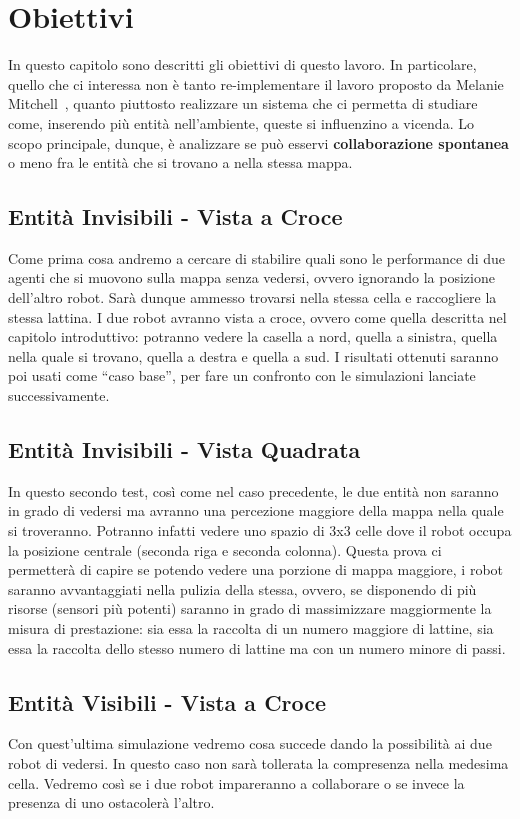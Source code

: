 \chapter{Obiettivi}
In questo capitolo sono descritti gli obiettivi di questo lavoro. In
particolare, quello che ci interessa non è tanto re-implementare il lavoro
proposto da Melanie Mitchell~\cite{biblio:robby}, quanto piuttosto realizzare un
sistema che ci permetta di studiare come, inserendo più entità nell'ambiente,
queste si influenzino a vicenda.\newline
Lo scopo principale, dunque, è analizzare se può esservi \textbf{collaborazione
spontanea} o meno fra le entità che si trovano a nella stessa mappa.



\section{Entità Invisibili - Vista a Croce}
Come prima cosa andremo a cercare di stabilire quali sono le performance di due
agenti che si muovono sulla mappa senza vedersi, ovvero ignorando la posizione
dell'altro robot. Sarà dunque ammesso trovarsi nella stessa cella e raccogliere
la stessa lattina.\newline
I due robot avranno vista a croce, ovvero come quella descritta nel capitolo
introduttivo: potranno vedere la casella a nord, quella a sinistra, quella nella
quale si trovano, quella a destra e quella a sud.\newline
I risultati ottenuti saranno poi usati come ``caso base'', per fare un confronto
con le simulazioni lanciate successivamente.



\section{Entità Invisibili - Vista Quadrata}
In questo secondo test, così come nel caso precedente, le due entità non saranno
in grado di vedersi ma avranno una percezione maggiore della mappa nella quale
si troveranno. Potranno infatti vedere uno spazio di 3x3 celle dove il robot
occupa la posizione centrale (seconda riga e seconda colonna).\newline
Questa prova ci permetterà di capire se potendo vedere una porzione di mappa
maggiore, i robot saranno avvantaggiati nella pulizia della stessa, ovvero, se
disponendo di più risorse (sensori più potenti) saranno in grado di massimizzare
maggiormente la misura di prestazione: sia essa la raccolta di un numero
maggiore di lattine, sia essa la raccolta dello stesso numero di lattine ma con
un numero minore di passi.



\section{Entità Visibili - Vista a Croce}
Con quest'ultima simulazione vedremo cosa succede dando la possibilità ai due
robot di vedersi. In questo caso non sarà tollerata la compresenza nella
medesima cella.\newline
Vedremo così se i due robot impareranno a collaborare o se invece la presenza
di uno ostacolerà l'altro.
